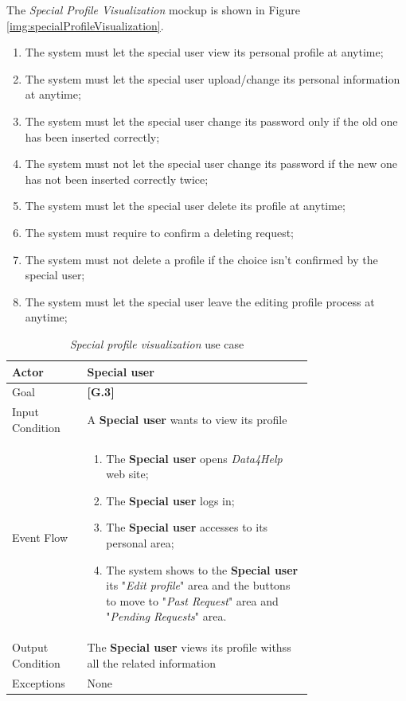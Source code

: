 The \textit{Special Profile Visualization} mockup is shown in Figure \ref{img:specialProfileVisualization}.

\begin{enumerate}
  \item The system must let the special user view its personal profile at anytime;
  \item The system must let the special user upload/change its personal information at anytime;
  \item The system must let the special user change its password only if the old one has been inserted correctly;
  \item The system must not let the special user change its password if the new one has not been inserted correctly twice;
  \item The system must let the special user delete its profile at anytime;
  \item The system must require to confirm a deleting request;
  \item The system must not delete a profile if the choice isn't confirmed by the special user;
  \item The system must let the special user leave the editing profile process at anytime;
\end{enumerate}

\begin{center}
\begin{table}
\begin{tabular}{ | l | p{0.75\linewidth} | }
  \hline
    Actor & \textbf{Special user} \\ \hline
    Goal & \textbf{[G.3]} \\ \hline
    Input Condition & A \textbf{Special user} wants to view its profile\\ \hline
    Event Flow & \begin{minipage}[t]{0.7\textwidth}
      \begin{enumerate}
        \item The \textbf{Special user } opens \textit{Data4Help} web site;
        \item The \textbf{Special user} logs in;
        \item The \textbf{Special user} accesses to its personal area;
        \item The system shows to the \textbf{Special user} its "\textit{Edit profile}" area and the buttons to move to "\textit{Past Request}" area and "\textit{Pending Requests}" area.
      \end{enumerate}
    \smallskip
  \end{minipage} \\ \hline
  Output Condition & The \textbf{Special user} views its profile withss all the related information\\ \hline
  Exceptions & None \\ \hline
\end{tabular}
\caption{\textit{Special profile visualization} use case}
\label{table:specialProfileVisualizationTable}
\end{table}
\end{center}

